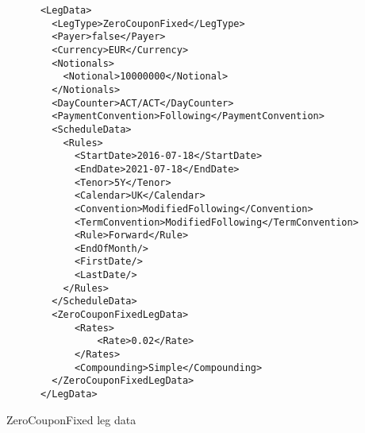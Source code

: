 \begin{listing}[H]
\begin{verbatim}
      <LegData>
        <LegType>ZeroCouponFixed</LegType>
        <Payer>false</Payer>
        <Currency>EUR</Currency>
        <Notionals>
          <Notional>10000000</Notional>
        </Notionals>
        <DayCounter>ACT/ACT</DayCounter>
        <PaymentConvention>Following</PaymentConvention>
        <ScheduleData>
          <Rules>
            <StartDate>2016-07-18</StartDate>
            <EndDate>2021-07-18</EndDate>
            <Tenor>5Y</Tenor>
            <Calendar>UK</Calendar>
            <Convention>ModifiedFollowing</Convention>
            <TermConvention>ModifiedFollowing</TermConvention>
            <Rule>Forward</Rule>
            <EndOfMonth/>
            <FirstDate/>
            <LastDate/>
          </Rules>
        </ScheduleData>
        <ZeroCouponFixedLegData>
            <Rates>
                <Rate>0.02</Rate>
            </Rates>
            <Compounding>Simple</Compounding>
        </ZeroCouponFixedLegData>
      </LegData>
\end{verbatim}
\caption{ZeroCouponFixed leg data}
\label{lst:zerolegdata}
\end{listing}

